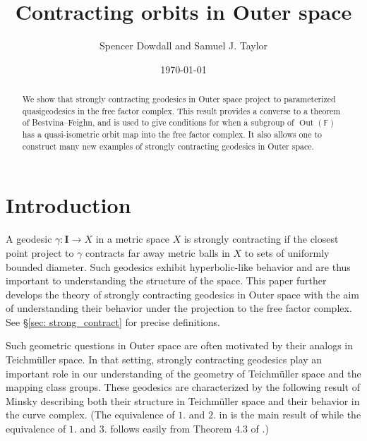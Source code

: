 \documentclass[letterpaper,fleqn]{article}
\theoremstyle{plain}
\theoremstyle{definition}
\DeclareMathOperator{\Out}{Out}
\newcommand{\free}{\mathbb{F}} %
\newcommand{\I}{\mathbf{I}}
\begin{document}
\title{\textbf{\Large Contracting orbits in Outer space}}
\author{Spencer Dowdall and Samuel J. Taylor}
\date{\today}

\maketitle

\begin{abstract}
We show that strongly contracting geodesics in Outer space project to parameterized quasigeodesics in the free factor complex. This result provides a converse to a theorem of Bestvina--Feighn, and is used to give conditions for when a subgroup of $\Out(\free)$ has a quasi-isometric orbit map into the free factor complex. It also allows one to construct many new examples of strongly contracting geodesics in Outer space.
\end{abstract}



\section{Introduction}

A geodesic $\gamma \colon \I \to X$ in a metric space $X$ is strongly contracting if the closest point project to $\gamma$ contracts far away metric balls in $X$ to sets of uniformly bounded diameter. Such geodesics exhibit hyperbolic-like behavior and are thus important to understanding the structure of the space.
This paper further develops the theory of strongly contracting geodesics in Outer space with the aim of understanding their behavior under the projection to the free factor complex. See \S\ref{sec: strong_contract} for precise definitions.  

Such geometric questions in Outer space are often motivated by their analogs in Teichm\"uller space. In that setting, strongly contracting geodesics play an important role in our understanding of the geometry of Teichm\"uller space and the mapping class groups. These geodesics are characterized by the following result of Minsky describing both their structure in Teichm\"uller space and their behavior in the curve complex. (The equivalence of $1.$ and $2.$ in  is the main result of \cite{Minsky96} while the equivalence of $1.$ and $3.$ follows easily from Theorem $4.3$ of \cite{Minsky96}.)
\end{document}
